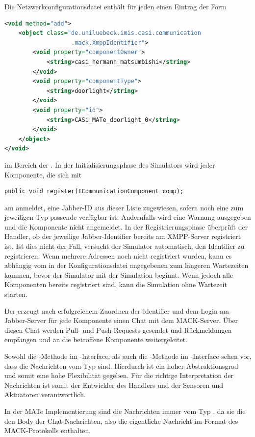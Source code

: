 Die Netzwerkconfigurationsdatei enthält für jeden  einen Eintrag der Form
\begin{lstlisting}[language=XML]
<void method="add">
	<object class="de.uniluebeck.imis.casi.communication
	               .mack.XmppIdentifier">
		<void property="componentOwner">
			<string>casi_hermann_matsumbishi</string>
		</void>
		<void property="componentType">
			<string>doorlight</string>
		</void>
		<void property="id">
			<string>CASi_MATe_doorlight_0</string>
		</void>
	</object>
</void>
\end{lstlisting}
 im Bereich der  . In der Initialisierungsphase des Simulators wird jeder Komponente, die sich mit \begin{lstlisting}
public void register(ICommunicationComponent comp);
\end{lstlisting}
am  anmeldet, eine Jabber-ID aus dieser Liste zugewiesen, sofern noch eine zum jeweiligen Typ passende verfügbar ist. Andernfalls wird eine Warnung ausgegeben und die Komponente nicht angemeldet.
In der Registrierungsphase überprüft der Handler, ob der jeweilige Jabber-Identifier bereits am XMPP-Server registriert ist. Ist dies nicht der Fall, versucht der Simulator automatisch, den Identifier zu registrieren. Wenn mehrere Adressen noch nicht registriert wurden, kann es abhängig vom in der Konfigurationsdatei angegebenen  zum längeren Wartezeiten kommen, bevor der Simulator mit der Simulation beginnt. Wenn jedoch alle Komponenten bereits registriert sind, kann die Simulation ohne Wartezeit starten.

Der  erzeugt nach erfolgreichem Zuordnen der Identifier und dem Login am Jabber-Server für jede Komponente einen Chat mit dem MACK-Server. Über diesen Chat werden Pull- und Push-Requests gesendet und Rückmeldungen empfangen und an die betroffene Komponente weitergeleitet.

Sowohl die -Methode im -Interface, als auch die -Methode im -Interface sehen vor, dass die Nachrichten vom Typ  sind. Hierdurch ist ein hoher Abstraktionsgrad und somit eine hohe Flexibilität gegeben. Für die richtige Interpretation der Nachrichten ist somit der Entwickler des Handlers und der Sensoren und Aktuatoren verantwortlich.

In der MATe Implementierung sind die Nachrichten immer vom Typ , da sie die den Body der Chat-Nachrichten, also die eigentliche Nachricht im Format des MACK-Protokolls enthalten.

